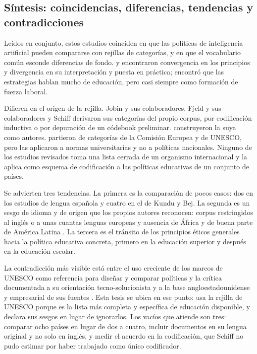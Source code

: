 \subsection{Síntesis: coincidencias, diferencias, tendencias y contradicciones}
\label{subsec:ea-sintesis}

Leídos en conjunto, estos estudios coinciden en que las políticas de inteligencia
artificial pueden compararse con rejillas de categorías, y en que el vocabulario común
esconde diferencias de fondo. \citet{jobin2019landscape} y \citet{fjeld2020principled}
encontraron convergencia en los principios y divergencia en su interpretación y puesta en
práctica; \citet{schiff2022education} encontró que las estrategias hablan mucho de
educación, pero casi siempre como formación de fuerza laboral.

Difieren en el origen de la rejilla. Jobin y sus colaboradores, Fjeld y sus colaboradores y
Schiff derivaron sus categorías del propio corpus, por codificación inductiva o por
depuración de un códebook preliminar. \citet{kundu2025aipolicies} construyeron la suya
como autores. \citet{martinezrojas2026regulacion} partieron de categorías de la Comisión
Europea y de UNESCO, pero las aplicaron a normas universitarias y no a políticas
nacionales. Ninguno de los estudios revisados toma una lista cerrada de un organismo
internacional y la aplica como esquema de codificación a las políticas educativas de un
conjunto de países.

Se advierten tres tendencias. La primera es la comparación de pocos casos: dos en los
estudios de lengua española y cuatro en el de Kundu y Bej. La segunda es un sesgo de idioma
y de origen que los propios autores reconocen: corpus restringidos al inglés o a unas
cuantas lenguas europeas y ausencia de África y de buena parte de América Latina
\citep{jobin2019landscape, fjeld2020principled, schiff2022education}. La tercera es el
tránsito de los principios éticos generales hacia la política educativa concreta, primero
en la educación superior y después en la educación escolar.

La contradicción más visible está entre el uso creciente de los marcos de UNESCO como
referencia para diseñar y comparar políticas y la crítica documentada a su orientación
tecno-solucionista y a la base angloestadounidense y empresarial de sus fuentes
\citep{mochizuki2025ethics}. Esta tesis se ubica en ese punto: usa la rejilla de UNESCO
porque es la lista más completa y específica de educación disponible, y declara sus sesgos
en lugar de ignorarlos. Los vacíos que atiende son tres: comparar ocho países en lugar de
dos a cuatro, incluir documentos en su lengua original y no solo en inglés, y medir el
acuerdo en la codificación, que Schiff no pudo estimar por haber trabajado como único
codificador.

